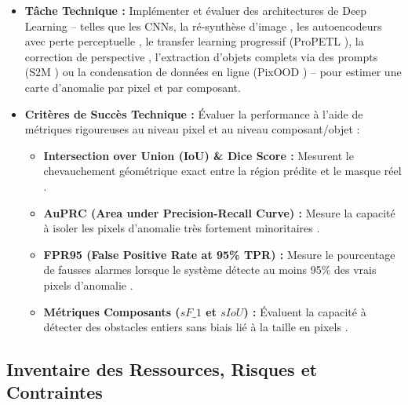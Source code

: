 \documentclass[11pt,a4paper]{article} \usepackage[utf8]{inputenc} \usepackage[T1]{fontenc}
\begin{document}
\begin{itemize} \item \textbf{Tâche Technique :} Implémenter et évaluer des architectures de Deep
Learning -- telles que les CNNs, la ré-synthèse d'image \cite{lis2019detecting}, les autoencodeurs avec
perte perceptuelle \cite{toyota2024}, le transfer learning progressif (ProPETL \cite{zhou2024propetl}),
la correction de perspective \cite{perspective2024}, l'extraction d'objets complets via des prompts (S2M
\cite{s2m2024}) ou la condensation de données en ligne (PixOOD \cite{pixood2024}) -- pour estimer une
carte d'anomalie par pixel et par composant. \item \textbf{Critères de Succès Technique :} Évaluer la
performance à l'aide de métriques rigoureuses au niveau pixel et au niveau composant/objet
\cite{chan2021segmentmeifyoucan, muller2024} :
\begin{itemize} \item \textbf{Intersection over Union (IoU) \& Dice Score :} Mesurent le chevauchement géométrique exact entre la région prédite et le masque réel \cite{muller2024}. \item \textbf{AuPRC (Area under Precision-Recall Curve) :} Mesure la capacité à isoler les pixels d'anomalie très fortement minoritaires \cite{chan2021segmentmeifyoucan}. \item \textbf{FPR95 (False Positive Rate at 95\% TPR) :} Mesure le pourcentage de fausses alarmes lorsque le système détecte au moins 95\% des vrais pixels d'anomalie \cite{zhao2024survey}. \item \textbf{Métriques Composants ($sF\_1$ et $sIoU$) :} Évaluent la capacité à détecter des obstacles entiers sans biais lié à la taille en pixels \cite{chan2021segmentmeifyoucan, s2m2024}.
\end{itemize}
\end{itemize}
\subsection{Inventaire des Ressources, Risques et Contraintes}
\end{document}
